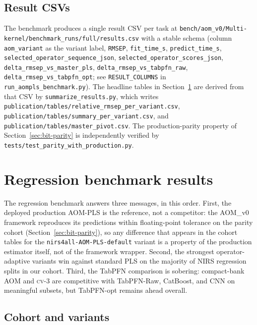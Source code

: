 \documentclass[review,a4paper]{elsarticle}
\newcommand{\AOM}{\textsc{AOM}\xspace}
\newcommand{\PLS}{\textsc{PLS}\xspace}
\begin{document}
\subsection{Result CSVs}
The benchmark produces a single result CSV per task at
\verb|bench/aom_v0/Multi-kernel/benchmark_runs/full/results.csv| with a stable
schema (column \verb|aom_variant| as the variant label,
\verb|RMSEP|, \verb|fit_time_s|, \verb|predict_time_s|,
\verb|selected_operator_sequence_json|,
\verb|selected_operator_scores_json|,
\verb|delta_rmsep_vs_master_pls|,
\verb|delta_rmsep_vs_tabpfn_raw|,
\verb|delta_rmsep_vs_tabpfn_opt|; see \verb|RESULT_COLUMNS| in
\verb|run_aompls_benchmark.py|). The headline tables in
Section~\ref{sec:results-regression} are derived from that CSV by
\verb|summarize_results.py|, which writes
\verb|publication/tables/relative_rmsep_per_variant.csv|,
\verb|publication/tables/summary_per_variant.csv|, and
\verb|publication/tables/master_pivot.csv|. The production-parity
property of
Section~\ref{sec:bit-parity} is independently verified by
\verb|tests/test_parity_with_production.py|.

\section{Regression benchmark results}\label{sec:results-regression}

The regression benchmark answers three messages, in this order. First,
the deployed production \AOM-\PLS is the reference, not a competitor:
the \AOM\_v0 framework reproduces its predictions within
floating-point tolerance on the parity cohort
(Section~\ref{sec:bit-parity}), so any difference that
appears in the cohort tables for the
\verb|nirs4all-AOM-PLS-default| variant is a property of the production
estimator itself, not of the framework wrapper. Second,
the strongest operator-adaptive variants win against standard \PLS on
the majority of NIRS regression splits in our cohort. Third, the
TabPFN comparison is sobering: compact-bank \AOM and \textsc{cv}-3 are
competitive with TabPFN-Raw, CatBoost, and CNN on meaningful subsets,
but TabPFN-opt remains ahead overall.

\subsection{Cohort and variants}
\end{document}
